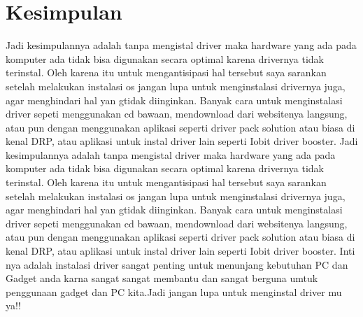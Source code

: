 \section{Kesimpulan}
Jadi kesimpulannya adalah tanpa mengistal driver maka hardware yang ada pada komputer ada tidak bisa digunakan secara optimal karena drivernya tidak terinstal. Oleh karena itu untuk mengantisipasi hal tersebut saya sarankan setelah melakukan instalasi os jangan lupa untuk menginstalasi drivernya juga, agar menghindari hal yan gtidak diinginkan. Banyak cara untuk menginstalasi driver sepeti menggunakan cd bawaan, mendownload dari websitenya langsung, atau pun dengan menggunakan aplikasi seperti driver pack solution atau biasa di kenal DRP, atau aplikasi untuk instal driver lain seperti Iobit driver booster.
Jadi kesimpulannya adalah tanpa mengistal driver maka hardware yang ada pada komputer ada tidak bisa digunakan secara optimal karena drivernya tidak terinstal. Oleh karena itu untuk mengantisipasi hal tersebut saya sarankan setelah melakukan instalasi os jangan lupa untuk menginstalasi drivernya juga, agar menghindari hal yan gtidak diinginkan. Banyak cara untuk menginstalasi driver sepeti menggunakan cd bawaan, mendownload dari websitenya langsung, atau pun dengan menggunakan aplikasi seperti driver pack solution atau biasa di kenal DRP, atau aplikasi untuk instal driver lain seperti Iobit driver booster. Inti nya adalah instalasi driver sangat penting untuk menunjang kebutuhan PC dan Gadget anda karna sangat sangat membantu dan sangat berguna umtuk penggunaan gadget dan PC kita.Jadi jangan lupa untuk menginstal driver mu ya!!
%
